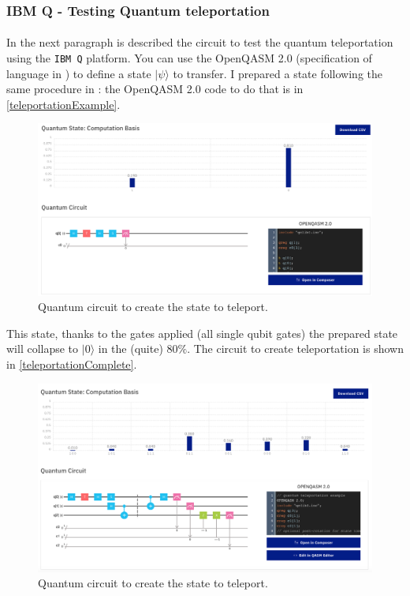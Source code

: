 \documentclass[a4paper,10pt]{article}
\begin{document}
\subsubsection{IBM Q - Testing Quantum teleportation}

\paragraph{} In the next paragraph is described the circuit to test the quantum teleportation using the \texttt{IBM Q} platform. You can use the OpenQASM 2.0 (specification of language in \cite{qasm2}) to define a state $|\psi\rangle$ to transfer. I prepared a state following the same procedure in \cite{teleportationUnderExp}: the OpenQASM 2.0 code to do that is in \autoref{teleportationExample}.
\begin{figure}[!htb]
\begin{center}
\includegraphics[width=4.5in]{images/teleportationExample.png}
\caption{Quantum circuit to create the state to teleport.}
\label{teleportationExample}
\end{center}
\end{figure}

This state, thanks to the gates applied (all single qubit gates) the prepared state will collapse to $|0\rangle$ in the (quite) $80\%$. The circuit to create teleportation is shown in \autoref{teleportationComplete}.
\begin{figure}[!htb]
\begin{center}
\includegraphics[width=4.5in]{images/teleportationCircuit.png}
\caption{Quantum circuit to create the state to teleport.}
\label{teleportationComplete}
\end{center}
\end{figure}
\end{document}
